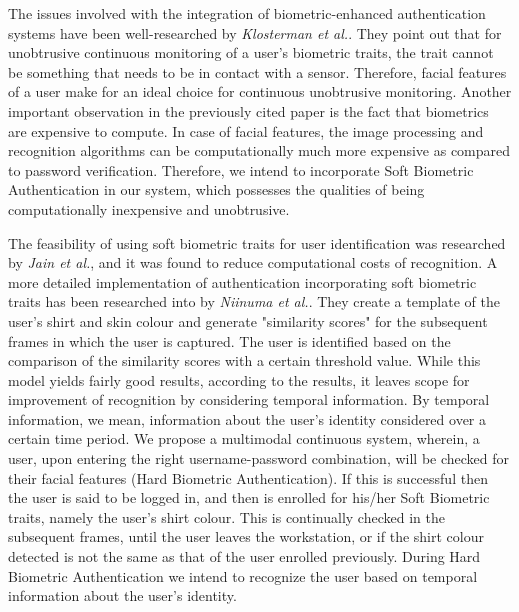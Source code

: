 \documentclass[%
        final,
        notitlepage,
        narroweqnarray,
        inline,
        ]{ieee}
\begin{document}
The issues involved with the integration of biometric-enhanced authentication systems have been well-researched by \emph {Klosterman et al.}\cite{Klos00}. They point out that for unobtrusive continuous monitoring of a user's biometric traits, the trait cannot be something that needs to be in contact with a sensor. Therefore, facial features of a user make for an ideal choice for continuous unobtrusive monitoring. Another important observation in the previously cited paper is the fact that biometrics are expensive to compute. In case of facial features, the image processing and recognition algorithms can be computationally much more expensive as compared to password verification. Therefore, we intend to incorporate Soft Biometric Authentication in our system, which possesses the qualities of being computationally inexpensive and unobtrusive.

The feasibility of using soft biometric traits for user identification was researched by \emph{Jain et al.}\cite{Jain204}, and it was found to reduce computational costs of recognition. A more detailed implementation of authentication incorporating soft biometric traits has been researched into by \emph{Niinuma et al.}\cite{Niin10}. They create a template of the user's shirt and skin colour and generate "similarity scores" for the subsequent frames in which the user is captured. The user is identified based on the comparison of the similarity scores with a certain threshold value. While this model yields fairly good results, according to the results, it leaves scope for improvement of recognition by considering temporal information. By temporal information, we mean, information about the user's identity considered over a certain time period. 
We propose a multimodal continuous system, wherein, a user, upon entering the right username-password combination, will be checked for their facial features (Hard Biometric Authentication). If this is successful then the user is said to be logged in, and then is enrolled for his/her Soft Biometric traits, namely the user's shirt colour. This is continually checked in the subsequent frames, until the user leaves the workstation, or if the shirt colour detected is not the same as that of the user enrolled previously. During Hard Biometric Authentication we intend to recognize the user based on temporal information about the user's identity.

\end{document}
